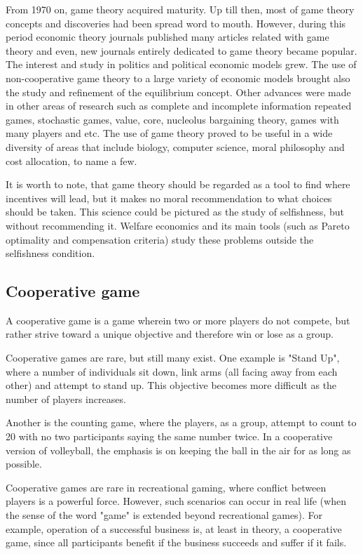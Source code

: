 From 1970 on, game theory acquired maturity. Up till then, most of game theory concepts and discoveries had been spread word to mouth. However, during this period economic theory journals published many articles related with game theory and even, new journals entirely dedicated to game theory became popular. The interest and study in politics and political economic models grew. The use of non-cooperative game theory to a large variety of economic models brought also the study and refinement of the equilibrium concept. Other advances were made in other areas of research such as complete and incomplete information repeated games, stochastic games, value, core, nucleolus bargaining theory, games with many players and etc. The use of game theory proved to be useful in a wide diversity of areas that include biology, computer science, moral philosophy and cost allocation, to name a few.

It is worth to note, that game theory should be regarded as a tool to find where incentives will lead, but it makes no moral recommendation to what choices should be taken. This science could be pictured as the study of selfishness, but without recommending it.  Welfare economics and its main tools (such as Pareto optimality and compensation criteria) study these problems outside the selfishness condition.
\newpage
\subsection{Cooperative game}
A cooperative game is a game wherein two or more players do not compete, but rather strive toward a unique objective and therefore win or lose as a group.

Cooperative games are rare, but still many exist. One example is "Stand Up", where a number of individuals sit down, link arms (all facing away from each other) and attempt to stand up. This objective becomes more difficult as the number of players increases.

Another is the counting game, where the players, as a group, attempt to count to 20 with no two participants saying the same number twice. In a cooperative version of volleyball, the emphasis is on keeping the ball in the air for as long as possible.

Cooperative games are rare in recreational gaming, where conflict between players is a powerful force. However, such scenarios can occur in real life (when the sense of the word "game" is extended beyond recreational games). For example, operation of a successful business is, at least in theory, a cooperative game, since all participants benefit if the business succeeds and suffer if it fails.

